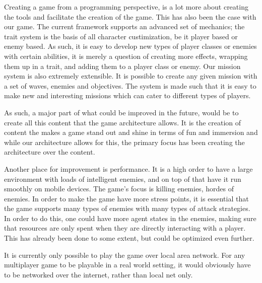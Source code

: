 Creating a game from a programming perspective, is a lot more about creating the tools and facilitate the creation of the game. 
This has also been the case with our game. The current framework supports an advanced set of mechanics; the trait system is the basis of all character custimization, be it player based or enemy based. As such, it is easy to develop new types of player classes or enemies with certain abilities, it is merely a question of creating more effects, wrapping them up in a trait, and adding them to a player class or enemy. Our mission system is  also extremely extensible. It is possible to create any given mission with a set of waves, enemies and objectives. The system is made such that it is easy to make new and interesting missions which can cater to different types of players. 

As such, a major part of what could be improved in the future, would be to create all this content that the game architecture allows. It is the creation of content the makes a game stand out and shine in terms of fun and immersion and while our architecture allows for this, the primary focus has been creating the architecture over the content. 

Another place for improvement is performance. It is a high order to have a large environment with loads of intelligent enemies, and on top of that have it run smoothly on mobile devices. The game's focus is killing enemies, hordes of enemies. In order to make the game have more stress points, it is essential that the game supports many types of enemies with many types of attack strategies. In order to do this, one could have more agent states in the enemies, making sure that resources are only spent when they are directly interacting with a player. This has already been done to some extent, but could be optimized even further.

It is currently only possible to play the game over local area network. For any multiplayer game to be playable in a real world setting, it would obviously have to be networked over the internet, rather than local net only.